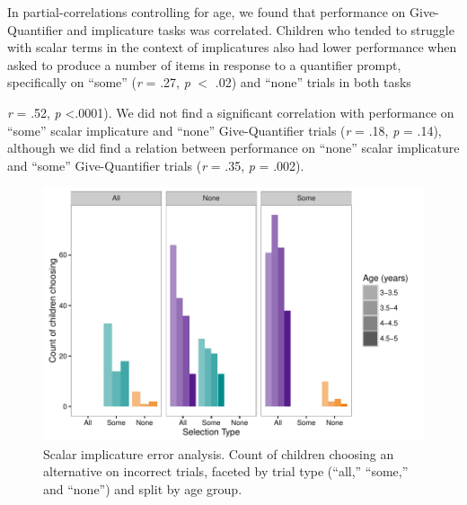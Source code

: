 \documentclass[man]{apa2}
\begin{document}
In partial-correlations controlling for age, we found that performance on Give-Quantifier and implicature tasks was correlated. Children who tended to struggle with scalar terms in the context of implicatures also had lower performance when asked to produce a number of items in response to a quantifier prompt, specifically on ``some''  (\textit{r} = .27, \textit{p} $<$ .02) and ``none'' trials in both tasks {\textit{r} = .52, \textit{p} \textless .0001). We did not find a significant correlation with performance on ``some'' scalar implicature and ``none'' Give-Quantifier trials (\textit{r} = .18, \textit{p} = .14), although we did find a relation between performance on ``none'' scalar implicature and ``some'' Give-Quantifier trials (\textit{r} = .35, \textit{p} = .002).



\begin{figure}
 \begin{center}
  \includegraphics[width=6in]{figures/exp3_SIwrong.pdf}
  \caption{\label{fig:exp3_wrong} Scalar implicature error analysis. Count of children choosing an alternative on incorrect trials, faceted by trial type (``all,'' ``some,'' and ``none'') and split by age group.}
 \end{center}
\end{figure}


}
\end{document}
